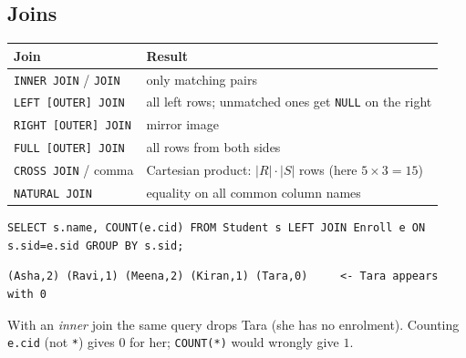 \documentclass[11pt,a4paper]{article}
\begin{document}
\subsection{Joins}
\begin{center}
\small
\begin{tabularx}{\textwidth}{>{\raggedright\arraybackslash}p{3.8cm}>{\raggedright\arraybackslash}X}
\toprule
\textbf{Join} & \textbf{Result}\\
\midrule
\texttt{INNER JOIN} / \texttt{JOIN} & only matching pairs\\
\texttt{LEFT [OUTER] JOIN} & all left rows; unmatched ones get \texttt{NULL} on the right\\
\texttt{RIGHT [OUTER] JOIN} & mirror image\\
\texttt{FULL [OUTER] JOIN} & all rows from both sides\\
\texttt{CROSS JOIN} / comma & Cartesian product: $|R|\cdot|S|$ rows (here $5\times3=15$)\\
\texttt{NATURAL JOIN} & equality on all common column names\\
\bottomrule
\end{tabularx}
\end{center}
\begin{lstlisting}[style=sql]
SELECT s.name, COUNT(e.cid) FROM Student s LEFT JOIN Enroll e ON s.sid=e.sid GROUP BY s.sid;
\end{lstlisting}
\begin{lstlisting}[style=out]
(Asha,2) (Ravi,1) (Meena,2) (Kiran,1) (Tara,0)     <- Tara appears with 0
\end{lstlisting}
With an \emph{inner} join the same query drops Tara (she has no enrolment). Counting \texttt{e.cid} (not \texttt{*}) gives $0$ for her; \texttt{COUNT(*)} would wrongly give $1$.
\end{document}

